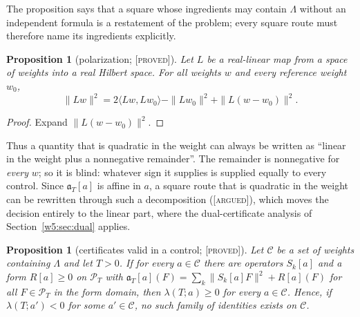 \documentclass[11pt]{amsart}
\newtheorem{proposition}[theorem]{Proposition}
\theoremstyle{definition}
\theoremstyle{remark}
\numberwithin{equation}{section}
\newcommand{\PT}{\mathcal{P}_T}                        %
\newcommand{\aT}{\mathfrak{a}_T}                       %
\newcommand{\stag}[1]{\textsc{[#1]}}
\newcommand{\PROVED}{\stag{proved}}
\newcommand{\ARGUED}{\stag{argued}}
\begin{document}
The proposition says that a square whose ingredients may contain $\Lambda$ without an independent formula is a restatement of
the problem; every square route must therefore name its ingredients explicitly.

\begin{proposition}[polarization; \PROVED]\label{w4:prop:polar}
Let $L$ be a real-linear map from a space of weights into a real Hilbert space. For all weights $w$ and every reference weight $w_0$,
\[
\|Lw\|^2=2\langle Lw,Lw_0\rangle-\|Lw_0\|^2+\|L(w-w_0)\|^2 .
\]
\end{proposition}

\begin{proof}
Expand $\|L(w-w_0)\|^2$.
\end{proof}

Thus a quantity that is quadratic in the weight can always be written as ``linear in the weight plus a nonnegative remainder''. The
remainder is nonnegative for \emph{every} $w$; so it is blind: whatever sign it supplies is supplied equally to every control.
Since $\aT[a]$ is affine in $a$, a square route that is quadratic in the weight can be rewritten through such a decomposition (\ARGUED),
which moves the decision entirely to the linear part, where the dual-certificate analysis of Section~\ref{w5:sec:dual} applies.

\begin{proposition}[certificates valid in a control; \PROVED]\label{w4:prop:controls}
Let $\mathcal C$ be a set of weights containing $\Lambda$ and let $T>0$. If for every $a\in\mathcal C$ there are operators $S_k[a]$ and a form
$R[a]\ge0$ on $\PT$ with $\aT[a](F)=\sum_k\|S_k[a]F\|^2+R[a](F)$ for all $F\in\PT$ in the form domain, then $\lambda(T;a)\ge0$ for
every $a\in\mathcal C$. Hence, if $\lambda(T;a')<0$ for some $a'\in\mathcal C$, no such family of identities exists on $\mathcal C$.
\end{proposition}
\end{document}
